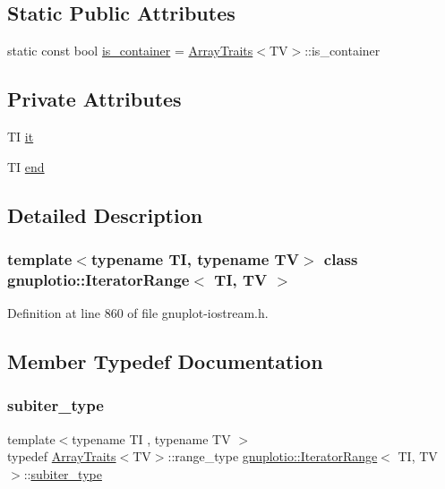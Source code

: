 \subsection*{Static Public Attributes}
\begin{DoxyCompactItemize}
\item 
static const bool \hyperlink{classgnuplotio_1_1_iterator_range_a3f79d84bdf18761b6e49ae54d050f8ff}{is\+\_\+container} = \hyperlink{classgnuplotio_1_1_array_traits}{Array\+Traits}$<$TV$>$\+::is\+\_\+container
\end{DoxyCompactItemize}
\subsection*{Private Attributes}
\begin{DoxyCompactItemize}
\item 
TI \hyperlink{classgnuplotio_1_1_iterator_range_a0690732cf3ceea8c906cef20795686af}{it}
\item 
TI \hyperlink{classgnuplotio_1_1_iterator_range_a495da9f5b28eafb67a8398ceb90638fb}{end}
\end{DoxyCompactItemize}


\subsection{Detailed Description}
\subsubsection*{template$<$typename TI, typename TV$>$\newline
class gnuplotio\+::\+Iterator\+Range$<$ T\+I, T\+V $>$}



Definition at line 860 of file gnuplot-\/iostream.\+h.



\subsection{Member Typedef Documentation}
\mbox{\label{classgnuplotio_1_1_iterator_range_a566ca30462a029f6df4ef16116f99acd}} 
\subsubsection{\texorpdfstring{subiter\+\_\+type}{subiter\_type}}
{\footnotesize\ttfamily template$<$typename TI , typename TV $>$ \\
typedef \hyperlink{classgnuplotio_1_1_array_traits}{Array\+Traits}$<$TV$>$\+::range\+\_\+type \hyperlink{classgnuplotio_1_1_iterator_range}{gnuplotio\+::\+Iterator\+Range}$<$ TI, TV $>$\+::\hyperlink{classgnuplotio_1_1_iterator_range_a566ca30462a029f6df4ef16116f99acd}{subiter\+\_\+type}}



